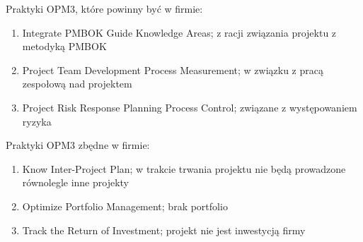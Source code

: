 Praktyki OPM3, które powinny być w firmie:

\begin{enumerate}
\item Integrate PMBOK Guide Knowledge Areas; z racji związania projektu z metodyką PMBOK
\item Project Team Development Process Measurement; w związku z pracą zespołową nad projektem
\item Project Risk Response Planning Process Control; związane z występowaniem ryzyka
\end{enumerate}

Praktyki OPM3 zbędne w firmie:

\begin{enumerate}
\item Know Inter-Project Plan; w trakcie trwania projektu nie będą prowadzone równolegle inne projekty
\item Optimize Portfolio Management; brak portfolio
\item Track the Return of Investment; projekt nie jest inwestycją firmy
\end{enumerate}

